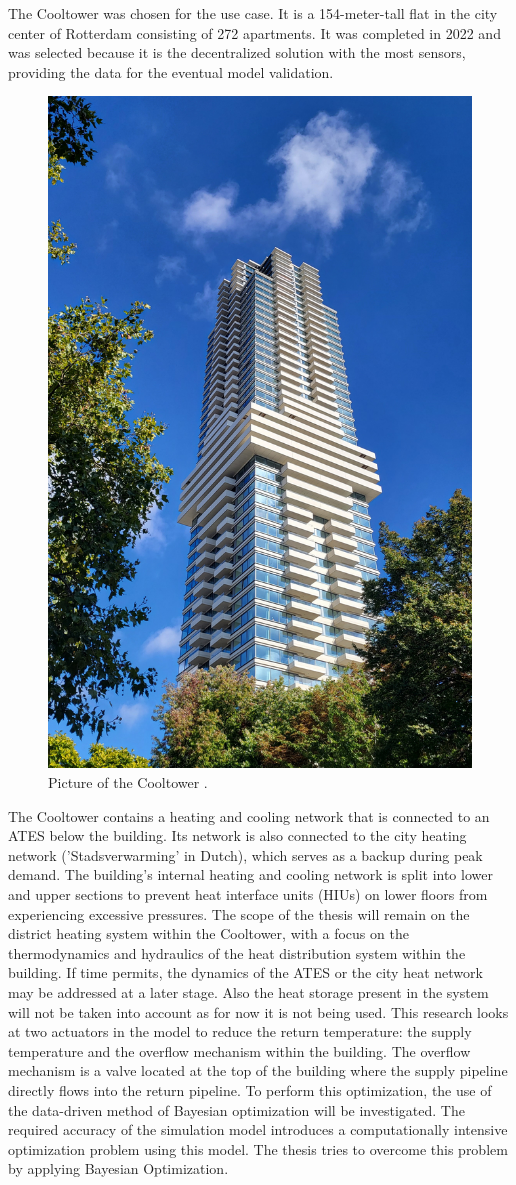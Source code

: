 The Cooltower was chosen for the use case. It is a 154-meter-tall flat in the city center of Rotterdam consisting of 272 apartments. It was completed in 2022 and was selected because it is the decentralized solution with the most sensors, providing the data for the eventual model validation.

\begin{figure}[h]
    \centering
    \includegraphics[width=0.5\linewidth]{figuresLIT/Cooltorenfoto.jpg}
    \caption{Picture of the Cooltower \cite{fotoCooltoren}.}
    \label{fig:Cooltoren}
\end{figure}

The Cooltower contains a heating and cooling network that is connected to an ATES below the building. Its network is also connected to the city heating network ('Stadsverwarming' in Dutch), which serves as a backup during peak demand. The building's internal heating and cooling network is split into lower and upper sections to prevent heat interface units (HIUs) on lower floors from experiencing excessive pressures. The scope of the thesis will remain on the district heating system within the Cooltower, with a focus on the thermodynamics and hydraulics of the heat distribution system within the building. If time permits, the dynamics of the ATES or the city heat network may be addressed at a later stage. Also the heat storage present in the system will not be taken into account as for now it is not being used.
This research looks at two actuators in the model to reduce the return temperature: the supply temperature and the overflow mechanism within the building. The overflow mechanism is a valve located at the top of the building where the supply pipeline directly flows into the return pipeline. To perform this optimization, the use of the data-driven method of Bayesian optimization will be investigated. The required accuracy of the simulation model introduces a computationally intensive optimization problem using this model. The thesis tries to overcome this problem by applying Bayesian Optimization.  

